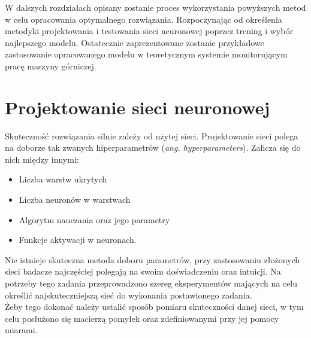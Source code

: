 \documentclass[12pt, a4paper, oneside]{article}
\begin{document}
	W dalszych rozdziałach opisany zostanie proces wykorzystania powyższych metod w celu opracowania optymalnego rozwiązania. Rozpoczynając od określenia metodyki projektowania i testowania sieci neuronowej poprzez trening i wybór najlepszego modelu. Ostatecznie zaprezentowane zostanie przykładowe zastosowanie opracowanego modelu w teoretycznym systemie monitorującym pracę maszyny górniczej. 
	
	
	
	
	
	
	
	
	\newpage
	
	\section{Projektowanie sieci neuronowej}
	Skuteczność rozwiązania silnie zależy od użytej sieci. Projektowanie sieci polega na doborze tak zwanych hiperparametrów (\textit{ang. hyperparameters}). Zalicza się do nich między innymi:
	\begin{itemize}
		\item Liczba warstw ukrytych
		\item Liczba neuronów w warstwach
		\item Algorytm nauczania oraz jego parametry
		\item Funkcje aktywacji w neuronach.
	\end{itemize}

	Nie istnieje skuteczna metoda doboru parametrów, przy zastosowaniu złożonych sieci badacze najczęściej polegają na swoim doświadczeniu oraz intuicji. Na potrzeby tego zadania przeprowadzono szereg eksperymentów mających na celu określić najskuteczniejszą sieć do wykonania postawionego zadania. \\
	
	Żeby tego dokonać należy ustalić sposób pomiaru skuteczności danej sieci, w tym celu posłużono się macierzą pomyłek oraz zdefiniowanymi przy jej pomocy miarami.
\end{document}
